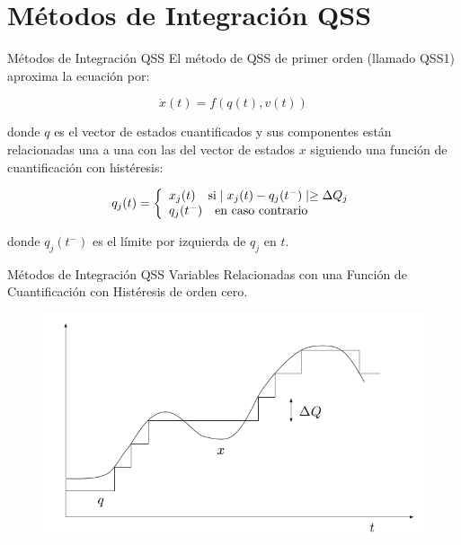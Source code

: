 \documentclass{beamer}
\begin{document}
\section{Métodos de Integración QSS}
\begin{frame}{Métodos de Integración QSS}
	El método de QSS de primer orden (llamado QSS1) aproxima la ecuación por:
	
	\begin{equation*}
	\dot{x}(t) = f (q(t), v(t))
	\end{equation*}
	
	donde $q$ es el vector de estados cuantificados y sus componentes están relacionadas una a una con las del vector de estados $x$ siguiendo una 
	función de cuantificación con histéresis:
	
	\begin{equation*}
	q_j(t) = \left\{ 
	  \begin{array}{l l}
	    x_j(t)  \quad \text{si} \mid x_j (t ) - q_j (t^{-} ) \mid \geq \Delta Q_j \\
	    q_j (t^{-} ) \quad \text{en caso contrario}
	  \end{array} \right.
	\end{equation*}
	
	donde $q_j (t^{-})$ es el límite por izquierda de $q_j$ en $t$.
\end{frame}

\begin{frame}{Métodos de Integración QSS}
	  Variables Relacionadas con una Función de Cuantificación con Histéresis de orden cero.
	\begin{figure}[H]
	  \includegraphics[scale=0.35]{histeresis1}
	\end{figure}
\end{frame}
\end{document}

